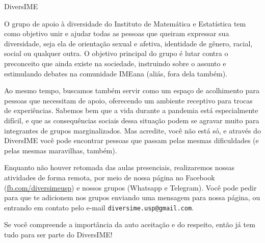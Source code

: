 \begin{subsecao}{DiversIME}


O grupo de apoio à diversidade do Instituto de Matemática e Estatística tem como
objetivo unir e ajudar todas as pessoas que queiram expressar sua diversidade,
seja ela de orientação sexual e afetiva, identidade de gênero, racial, social ou
qualquer outra. O objetivo principal do grupo é lutar contra o preconceito que
ainda existe na sociedade, instruindo sobre o assunto e estimulando debates na
comunidade IMEana (aliás, fora dela também).

Ao mesmo tempo, buscamos também servir como um espaço de acolhimento para pessoas
que necessitam de apoio, oferecendo um ambiente receptivo para trocas de experiências.
Sabemos bem que a vida durante a pandemia está especialmente difícil, e que as
consequências sociais dessa situação podem se agravar muito para integrantes de grupos
marginalizados. Mas acredite, você não está só, e através do DiversIME você pode
encontrar pessoas que passam pelas mesmas dificuldades (e pelas mesmas maravilhas, também).

Enquanto não houver retomada das aulas presenciais, realizaremos nossas atividades
de forma remota, por meio de nossa página no Facebook (\url{fb.com/diversimeusp})
e nossos grupos (Whatsapp e Telegram). Você pode pedir para que te adicionem nos grupos
enviando uma mensagem para nossa página, ou entrando em contato pelo e-mail
{\tt diversime.usp@gmail.com}.

Se você compreende a importância da auto aceitação e do respeito, então já tem tudo
para ser parte do DiversIME!

\end{subsecao}

